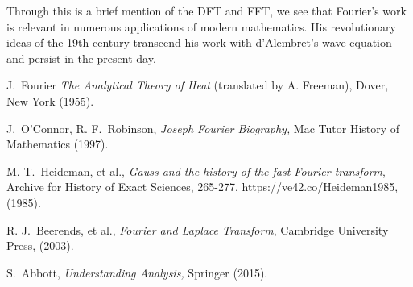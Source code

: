 \documentclass[11pt]{amsart}
\theoremstyle{plain}
\theoremstyle{definition}
\begin{document}
Through this is a brief mention of the DFT and FFT, we see that Fourier's work is relevant in numerous applications of modern mathematics. His revolutionary ideas of the 19th century transcend his work with d'Alembret's wave equation and persist in the present day. 

\begin{thebibliography}{999}

    J.\ Fourier {\em The Analytical Theory of Heat} (translated by A. Freeman), Dover, New York (1955). 

    J.\ O'Connor, R. F.\ Robinson, {\em Joseph Fourier Biography,} Mac Tutor History of Mathematics (1997).

    M. T.\ Heideman, et al., \textit{Gauss and the history of the fast Fourier transform}, Archive for History of Exact Sciences, 265-277, https://ve42.co/Heideman1985, (1985).

    R. J.\ Beerends, et al., \textit{Fourier and Laplace Transform}, Cambridge University Press, (2003).

    S.\ Abbott, {\em Understanding Analysis,} Springer (2015).
	
\end{thebibliography}
\end{document}
